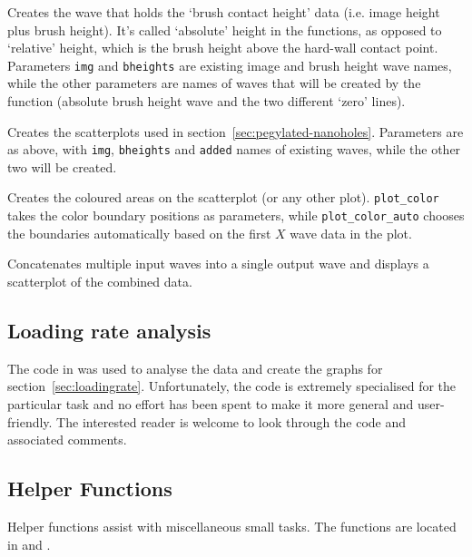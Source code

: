 \documentclass[12pt,a4paper]{article}
\begin{document}
\begin{description}[style=nextline]

\item[absrelheights]
Creates the wave that holds the \enquote*{brush contact height} data (i.e. image height plus brush height). It's called \enquote*{absolute} height in the functions, as opposed to \enquote*{relative} height, which is the brush height above the hard-wall contact point.
Parameters \texttt{img} and \texttt{bheights} are existing image and brush height wave names, while the other parameters are names of waves that will be created by the function (absolute brush height wave and the two different \enquote*{zero} lines).

\item[scatterplots]
Creates the scatterplots used in section~\ref{sec:pegylated-nanoholes}. Parameters are as above, with \texttt{img}, \texttt{bheights} and \texttt{added} names of existing waves, while the other two will be created.

\item[plot\_color, plot\_color\_auto]
Creates the coloured areas on the scatterplot (or any other plot). \texttt{plot\_color} takes the color boundary positions as parameters, while \texttt{plot\_color\_auto} chooses the boundaries automatically based on the first $X$ wave data in the plot.

\item[absrelheights\_combine]
Concatenates multiple input waves into a single output wave and displays a scatterplot of the combined data.

\end{description}

\subsection{Loading rate analysis}
The code in  was used to analyse the data and create the graphs for section~\ref{sec:loadingrate}. Unfortunately, the code is extremely specialised for the particular task and no effort has been spent to make it more general and user-friendly.
The interested reader is welcome to look through the code and associated comments.


\subsection{Helper Functions}
Helper functions assist with miscellaneous small tasks. The functions are located in  and .
\end{document}
